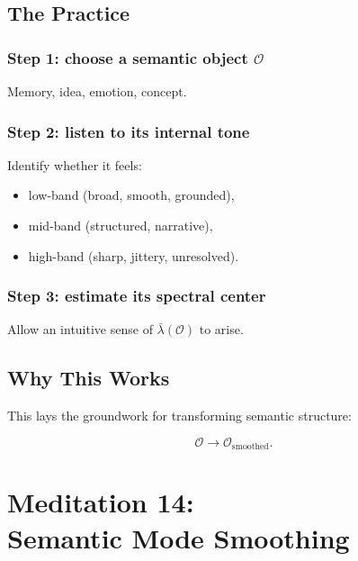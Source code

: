 \documentclass[12pt]{article}
\begin{document}
\section{The Practice}

\subsection*{Step 1: choose a semantic object $\mathcal{O}$}

Memory, idea, emotion, concept.

\subsection*{Step 2: listen to its internal tone}

Identify whether it feels:

\begin{itemize}
\item low-band (broad, smooth, grounded),
\item mid-band (structured, narrative),
\item high-band (sharp, jittery, unresolved).
\end{itemize}


\subsection*{Step 3: estimate its spectral center}

Allow an intuitive sense of $\bar{\lambda}(\mathcal{O})$ to arise.

\section{Why This Works}

This lays the groundwork for transforming semantic structure:

\[
\mathcal{O} \to \mathcal{O}_{\mathrm{smoothed}}.
\]

\newpage


\chapter{Meditation 14:\\ Semantic Mode Smoothing}
\end{document}
